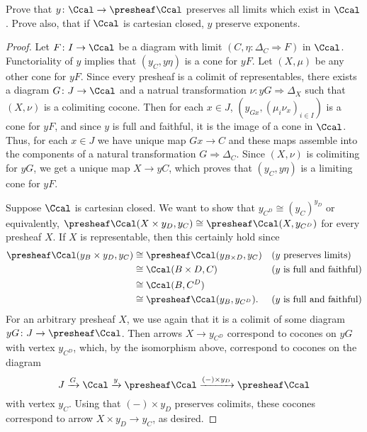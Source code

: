 \begin{exercise}{5}
    Prove that $y\colon\Ccal\to\presheaf\Ccal$ preserves all limits which exist in $\Ccal$. Prove also, that if $\Ccal$ is cartesian closed, $y$ preserve exponents.
    \begin{solution}
        \begin{proof}
           Let $F\colon I\to \Ccal$ be a diagram with limit $(C,\eta\colon \Delta_C\Rightarrow F)$ in $\Ccal$. Functoriality of $y$ implies that $(y_C,y\eta)$ is a cone for $yF$. Let $(X,\mu)$ be any other cone for $yF$. Since every presheaf is a colimit of representables, there exists a diagram $G\colon J\to\Ccal$ and a natrual transformation $\nu\colon yG\Rightarrow\Delta_X$ such that $(X,\nu)$ is a colimiting cocone. Then for each $x\in J$, $(y_{Gx},(\mu_i\nu_{x})_{i\in I})$ is a cone for $yF$, and since $y$ is full and faithful, it is the image of a cone in $\Ccal$. Thus, for each $x\in J$ we have unique map $Gx\to C$ and these maps assemble into the components of a natural transformation $G\Rightarrow\Delta_C$. Since $(X,\nu)$ is colimiting for $yG$, we get a unique map $X\to yC$, which proves that $(y_C,y\eta)$ is a limiting cone for $yF$.

           Suppose $\Ccal$ is cartesian closed. We want to show that $y_{C^D}\cong (y_C)^{y_D}$ or equivalently, $\presheaf\Ccal(X\times y_D, y_C)\cong\presheaf\Ccal(X,y_{C^D})$ for every presheaf $X$. If $X$ is representable, then this certainly hold since
           \begin{align*}
            \presheaf\Ccal(y_B\times y_D, y_C)&\cong\presheaf\Ccal(y_{B\times D}, y_C)&&(y\text{ preserves limits})\\
            &\cong\Ccal(B\times D, C)&&(y\text{ is full and faithful})\\
            &\cong\Ccal(B,C^D)\\
            &\cong\presheaf\Ccal(y_B, y_{C^D}).&&(y\text{ is full and faithful})
           \end{align*}
           For an arbitrary presheaf $X$, we use again that it is a colimit of some diagram $yG\colon J\to\presheaf\Ccal$. Then arrows $X\to y_{C^D}$ correspond to cocones on $yG$ with vertex $y_{C^D}$, which, by the isomorphism above, correspond to cocones on the diagram
           \[J\xrightarrow{G}\Ccal\xrightarrow{y}\presheaf\Ccal\xrightarrow{(-)\times y_D}\presheaf\Ccal\]
           with vertex $y_C$. Using that $(-)\times y_D$ preserves colimits, these cocones correspond to arrow $X\times y_D\to y_C$, as desired. 
        \end{proof}
    \end{solution}
\end{exercise}

